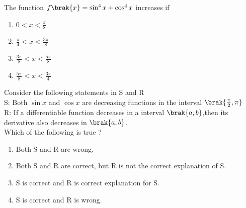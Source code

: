 \item The function $f\brak{x}= \sin^4{x}+\cos^4{x}$ increases if \hfill {}
\begin{multicols}{2}
\begin{enumerate}
    \item $0<x<\frac{\pi}{8}$
    \item $\frac{\pi}{4}<x<\frac{3\pi}{8}$
    \item $\frac{3\pi}{8} <x<\frac{5\pi}{8}$
    \item $\frac{5\pi}{8}<x<\frac{3\pi}{4}$
\end{enumerate}
\end{multicols}
\item Consider the following statements in S and R \hfill {}\\
S: Both $\sin{x}$ and $\cos{x}$ are decreasing functions in the interval $\brak{\frac{\pi}{2},\pi}$\\
R: If a differentiable function decreases in a interval $\brak{a,b}$,then its derivative also decreases in $\brak{a,b}$.\\
Which of the following is true ?
\begin{enumerate}
    \item Both S and R are wrong.
    \item Both S and R are correct, but R is not the correct explanation of S.
    \item S is correct and R is correct explanation for S.
    \item S is correct and R is wrong.
\end{enumerate}

